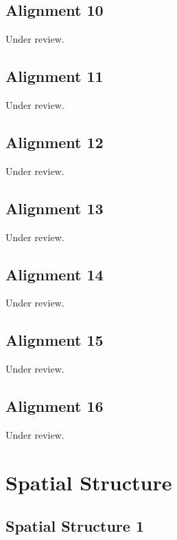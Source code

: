 \documentclass{scrartcl}
\begin{document}
\subsection{Alignment 10}
\label{sec:align_10}
Under review.%
\clearpage

\subsection{Alignment 11}
\label{sec:align_11}
Under review.%
\clearpage

\subsection{Alignment 12}
\label{sec:align_12}
Under review.%
\clearpage

\subsection{Alignment 13}
\label{sec:align_13}
Under review.%
\clearpage

\subsection{Alignment 14}
\label{sec:align_14}
Under review.%
\clearpage

\subsection{Alignment 15}
\label{sec:align_15}
Under review.%
\clearpage

\subsection{Alignment 16}
\label{sec:align_16}
Under review.%
\clearpage

\section{Spatial Structure}

\subsection{Spatial Structure 1}
\label{sec:spatial_1}
\clearpage
\end{document}
